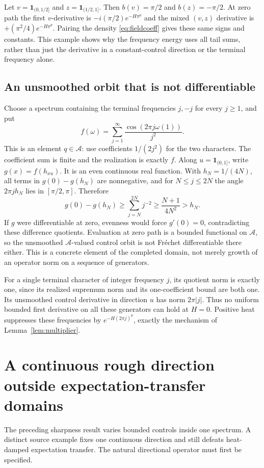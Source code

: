 \documentclass[11pt]{article}
\theoremstyle{remark}\newtheorem{remark}[theorem]{Remark}
\newcommand{\A}{\mathcal A}\newcommand{\X}{\mathcal X}
\begin{document}
Let $v=\mathbf1_{(0,1/2]}$ and $z=\mathbf1_{(1/2,1]}$. Then $b(v)=\pi/2$ and $b(z)=-\pi/2$. At zero path the first $v$-derivative is $-i(\pi/2)e^{-H\pi^p}$ and the mixed $(v,z)$ derivative is $+(\pi^2/4)e^{-H\pi^p}$. Pairing the density \eqref{eq:fieldcoeff} gives these same signs and constants. This example shows why the frequency energy uses all tail sums, rather than just the derivative in a constant-control direction or the terminal frequency alone.

\subsection{An unsmoothed orbit that is not differentiable}
Choose a spectrum containing the terminal frequencies $j,-j$ for every $j\ge1$, and put
\[
 f(\omega)=\sum_{j=1}^\infty\frac{\cos(2\pi j\omega(1))}{j^2}.
\]
This is an element $q\in\A$: use coefficients $1/(2j^2)$ for the two characters. The coefficient sum is finite and the realization is exactly $f$. Along $u=\mathbf1_{(0,1]}$, write $g(x)=f(h_{xu})$. It is an even continuous real function. With $h_N=1/(4N)$, all terms in $g(0)-g(h_N)$ are nonnegative, and for $N\le j\le2N$ the angle $2\pi jh_N$ lies in $[\pi/2,\pi]$. Therefore
\[
 g(0)-g(h_N)\ge\sum_{j=N}^{2N}j^{-2}
 \ge\frac{N+1}{4N^2}>h_N.
\]
If $g$ were differentiable at zero, evenness would force $g'(0)=0$, contradicting these difference quotients. Evaluation at zero path is a bounded functional on $\A$, so the unsmoothed $\A$-valued control orbit is not Fr\'echet differentiable there either. This is a concrete element of the completed domain, not merely growth of an operator norm on a sequence of generators.

For a single terminal character of integer frequency $j$, its quotient norm is exactly one, since its realized supremum norm and its one-coefficient bound are both one. Its unsmoothed control derivative in direction $u$ has norm $2\pi|j|$. Thus no uniform bounded first derivative on all these generators can hold at $H=0$. Positive heat suppresses these frequencies by $e^{-H(2\pi j)^p}$, exactly the mechanism of Lemma~\ref{lem:multiplier}.

\section{A continuous rough direction outside expectation-transfer domains}\label{sec:rough}
The preceding sharpness result varies bounded controls inside one
spectrum. A distinct source example fixes one continuous direction
and still defeats heat-damped expectation transfer. The natural
directional operator must first be specified.
\end{document}
